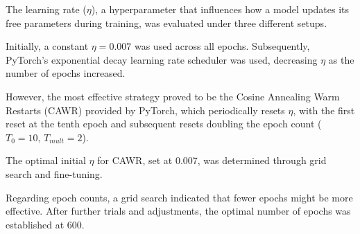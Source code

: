 The learning rate ($\eta$), a hyperparameter that influences how a model updates its free 
parameters during training, was evaluated under three different setups. 

Initially, a constant $\eta = 0.007$ was used across all epochs. Subsequently, PyTorch's exponential decay 
learning rate scheduler was used, decreasing $\eta$ as the number of epochs increased. 

However, 
the most effective strategy proved to be the Cosine Annealing Warm Restarts (CAWR) provided 
by PyTorch, which periodically resets $\eta$, with the first reset at the tenth epoch and 
subsequent resets doubling the epoch count ($T_0 = 10, \, T_{mult} = 2$). 

The optimal 
initial $\eta$ for CAWR, set at 0.007, was determined through grid search and fine-tuning.

Regarding epoch counts, a grid search indicated that fewer epochs might be more effective. 
After further trials and adjustments, the optimal number of epochs was established at 600.




